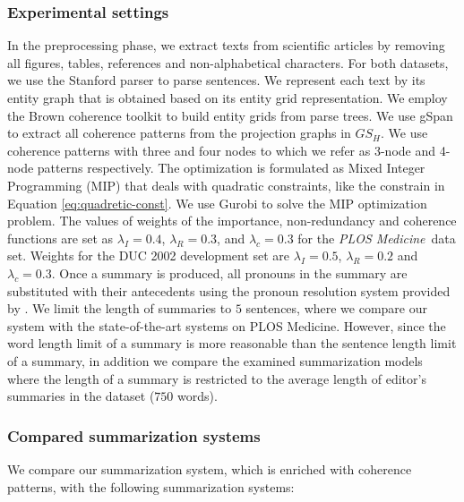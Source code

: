 \subsubsection{Experimental settings}
In the preprocessing phase, we extract texts from scientific articles by removing all figures, tables, references and \mbox{non-alphabetical} characters.
For both datasets, we use the Stanford parser \cite{klein03b} to parse sentences. 
We represent each text by its entity graph that is obtained based on its entity grid representation. 
We employ the Brown coherence toolkit \cite{elsner11b} to build entity grids from parse trees.  
We use gSpan \cite{yanxifeng02} to extract all coherence patterns from the projection graphs in $GS_H$. 
We use coherence patterns with three and four nodes to which we refer as 3-node and 4-node patterns respectively. 
The optimization is formulated as Mixed Integer Programming (MIP) that deals with quadratic constraints, like the constrain in Equation \ref{eq:quadretic-const}.  
We use Gurobi \cite{gurobi14} to solve the MIP optimization problem.
The values of weights of the importance, non-redundancy and coherence functions are set as 
$\lambda_{I}=0.4$, $\lambda_R=0.3$, and $\lambda_{c}=0.3$ for the \emph{PLOS Medicine}\ data set.  
Weights for the DUC 2002 development set are $\lambda_{I}=0.5$, $\lambda_R=0.2$ and $\lambda_{c}=0.3$.
Once a summary is produced, all pronouns in the summary are substituted with their antecedents using the pronoun resolution system provided by . 
We limit the length of summaries to $5$ sentences,  where we compare our system with the \mbox{state-of-the-art} systems on PLOS Medicine. 
However, since the word length limit of a summary is more reasonable than the sentence length limit of a summary, in addition we compare the examined summarization models where the length of a summary is restricted to the average length of editor's summaries in the dataset ($750$ words). 

\subsubsection{Compared summarization systems}
We compare our summarization system, which is enriched with coherence patterns, with the following summarization systems: 

